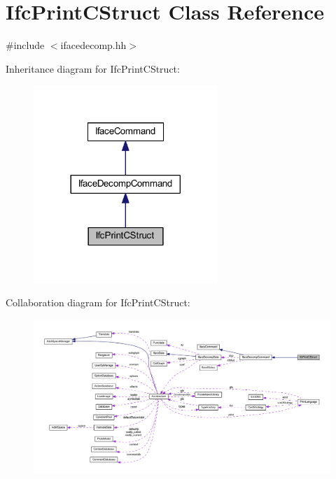 \hypertarget{class_ifc_print_c_struct}{}\section{Ifc\+Print\+C\+Struct Class Reference}
\label{class_ifc_print_c_struct}


{\ttfamily \#include $<$ifacedecomp.\+hh$>$}



Inheritance diagram for Ifc\+Print\+C\+Struct\+:
\nopagebreak
\begin{figure}[H]
\begin{center}
\leavevmode
\includegraphics[width=197pt]{class_ifc_print_c_struct__inherit__graph}
\end{center}
\end{figure}


Collaboration diagram for Ifc\+Print\+C\+Struct\+:
\nopagebreak
\begin{figure}[H]
\begin{center}
\leavevmode
\includegraphics[width=350pt]{class_ifc_print_c_struct__coll__graph}
\end{center}
\end{figure}
